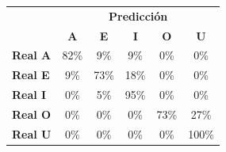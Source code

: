 \begin{tabular}{lccccc}
\toprule
 & \multicolumn{5}{c}{\textbf{Predicción}} \\
 & \textbf{A} & \textbf{E} & \textbf{I} & \textbf{O} & \textbf{U} \\
\midrule
\textbf{Real A} & \cellcolor[rgb]{0.43,0.43,1.00} \color{white} 82\% & \cellcolor[rgb]{0.94,0.94,1.00}  9\% & \cellcolor[rgb]{0.94,0.94,1.00}  9\% & \cellcolor[rgb]{1.00,1.00,1.00}  0\% & \cellcolor[rgb]{1.00,1.00,1.00}  0\% \\
\textbf{Real E} & \cellcolor[rgb]{0.94,0.94,1.00}  9\% & \cellcolor[rgb]{0.49,0.49,1.00} \color{white} 73\% & \cellcolor[rgb]{0.87,0.87,1.00}  18\% & \cellcolor[rgb]{1.00,1.00,1.00}  0\% & \cellcolor[rgb]{1.00,1.00,1.00}  0\% \\
\textbf{Real I} & \cellcolor[rgb]{1.00,1.00,1.00}  0\% & \cellcolor[rgb]{0.97,0.97,1.00}  5\% & \cellcolor[rgb]{0.33,0.33,1.00} \color{white} 95\% & \cellcolor[rgb]{1.00,1.00,1.00}  0\% & \cellcolor[rgb]{1.00,1.00,1.00}  0\% \\
\textbf{Real O} & \cellcolor[rgb]{1.00,1.00,1.00}  0\% & \cellcolor[rgb]{1.00,1.00,1.00}  0\% & \cellcolor[rgb]{1.00,1.00,1.00}  0\% & \cellcolor[rgb]{0.49,0.49,1.00} \color{white} 73\% & \cellcolor[rgb]{0.81,0.81,1.00}  27\% \\
\textbf{Real U} & \cellcolor[rgb]{1.00,1.00,1.00}  0\% & \cellcolor[rgb]{1.00,1.00,1.00}  0\% & \cellcolor[rgb]{1.00,1.00,1.00}  0\% & \cellcolor[rgb]{1.00,1.00,1.00}  0\% & \cellcolor[rgb]{0.30,0.30,1.00} \color{white} 100\% \\
\bottomrule
\end{tabular}